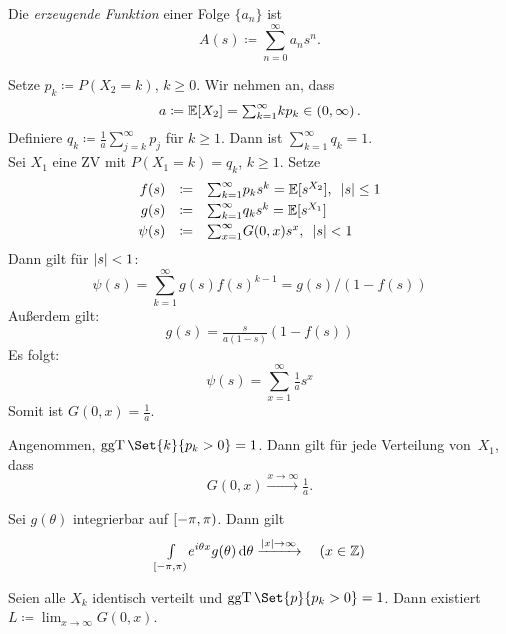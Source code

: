 \documentclass{cheat-sheet}
\newcommand{\E}{\mathbb{E}} %
\DeclareMathOperator{\ggT}{ggT} %
\begin{document}
\begin{defn}
  Die \emph{erzeugende Funktion} einer Folge $\{ a_n \}$ ist
  \[ A(s) \coloneqq {\sum}_{n=0}^\infty a_n s^n. \]
\end{defn}

\begin{bsp}
  Setze $p_k \coloneqq P(X_2 = k)$, $k \geq 0$.
  Wir nehmen an, dass
  \[ a \coloneqq \E[X_2] = {\sum}_{k=1}^\infty k p_k \in \ointerval{0}{\infty}. \]
  Definiere
  $q_k \coloneqq \tfrac{1}{a} {\sum}_{j=k}^\infty p_j$
  für $k \geq 1$.
  Dann ist ${\sum}_{k=1}^\infty q_k = 1$. \\
  Sei $X_1$ eine ZV mit $P(X_1=k) = q_k$, $k \geq 1$.
  Setze
  \[
    \begin{array}{r c l}
      f(s) &\coloneqq& {\sum}_{k=1}^\infty p_k s^k = \E[s^{X_2}], \enspace \abs{s} \leq 1 \\[0.1cm]
      g(s) &\coloneqq& {\sum}_{k=1}^\infty q_k s^k = \E[s^{X_1}] \\[0.1cm]
      \psi(s) &\coloneqq& {\sum}_{x=1}^\infty G(0, x) s^x, \enspace \abs{s} < 1
    \end{array}
  \]
  Dann gilt für $\lvert s\rvert < 1$:
  \[ \psi(s) = {\sum}_{k=1}^\infty g(s) f(s)^{k-1} = g(s)/(1 - f(s)) \]
  Außerdem gilt:
  \[ g(s) = \tfrac{s}{a (1-s)} (1 - f(s)) \]
  Es folgt:
  \[ \psi(s) = \sum_{x=1}^\infty \tfrac{1}{a} s^x \]
  Somit ist $G(0, x) = \tfrac{1}{a}$.
\end{bsp}

\begin{satz}
  Angenommen, $\ggT \Set{k}{p_k > 0} = 1$.
  Dann gilt für jede Verteilung von~$X_1$, dass
  \[ G(0, x) \xrightarrow{x \to \infty} \tfrac{1}{a}. \]
\end{satz}

\begin{lem}
  Sei $g(\theta)$ integrierbar auf $\left[ -\pi, \pi \right)$.
  Dann gilt
  \[
    {\textstyle \int\limits_{\left[ -\pi, \pi \right)}^{}} e^{i \theta x} g(\theta) \,\mathrm{d} \theta \xrightarrow{\lvert x\rvert \to \infty}
    \quad (x \in \mathbb{Z})
  \]
\end{lem}

\begin{lem}
  \begin{minipage}[t]{0.8 \linewidth}
    Seien alle $X_k$ identisch verteilt und $\ggT \Set{p}{p_k > 0} = 1$.
    Dann existiert $L \coloneqq {\lim}_{x \to \infty} G(0, x)$.
  \end{minipage}
\end{lem}
\end{document}
